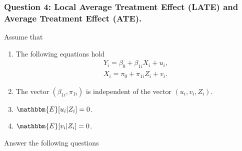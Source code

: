 \documentclass[11pt,letterpaper]{article}
\begin{document}
\newpage
\subsubsection*{Question 4: Local Average Treatment Effect (LATE) and Average Treatment Effect (ATE).}
Assume that
\begin{enumerate}
	\item The following equations hold
	\begin{align*}
	Y_{i}=\beta_{0}+\beta_{1i}X_{i}+u_{i},\\
	X_{i}=\pi_{0}+\pi_{1i}Z_{i}+v_{i}.
	\end{align*}
	\item The vector $(\beta_{1i},\pi_{1i})$ is independent of the vector $(u_{i},v_{i},Z_{i}).$
	\item $\mathbbm{E}[u_{i}|Z_{i}]=0$.
	\item $\mathbbm{E}[v_{i}|Z_{i}]=0$.
\end{enumerate}
Answer the following questions
\end{document}
